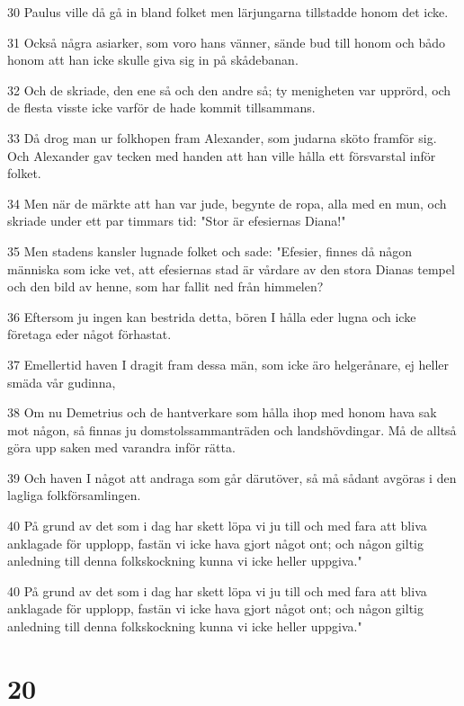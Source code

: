 \par 30 Paulus ville då gå in bland folket men lärjungarna tillstadde honom det icke.
\par 31 Också några asiarker, som voro hans vänner, sände bud till honom och bådo honom att han icke skulle giva sig in på skådebanan.
\par 32 Och de skriade, den ene så och den andre så; ty menigheten var upprörd, och de flesta visste icke varför de hade kommit tillsammans.
\par 33 Då drog man ur folkhopen fram Alexander, som judarna sköto framför sig. Och Alexander gav tecken med handen att han ville hålla ett försvarstal inför folket.
\par 34 Men när de märkte att han var jude, begynte de ropa, alla med en mun, och skriade under ett par timmars tid: "Stor är efesiernas Diana!"
\par 35 Men stadens kansler lugnade folket och sade: "Efesier, finnes då någon människa som icke vet, att efesiernas stad är vårdare av den stora Dianas tempel och den bild av henne, som har fallit ned från himmelen?
\par 36 Eftersom ju ingen kan bestrida detta, bören I hålla eder lugna och icke företaga eder något förhastat.
\par 37 Emellertid haven I dragit fram dessa män, som icke äro helgerånare, ej heller smäda vår gudinna,
\par 38 Om nu Demetrius och de hantverkare som hålla ihop med honom hava sak mot någon, så finnas ju domstolssammanträden och landshövdingar. Må de alltså göra upp saken med varandra inför rätta.
\par 39 Och haven I något att andraga som går därutöver, så må sådant avgöras i den lagliga folkförsamlingen.
\par 40 På grund av det som i dag har skett löpa vi ju till och med fara att bliva anklagade för upplopp, fastän vi icke hava gjort något ont; och någon giltig anledning till denna folkskockning kunna vi icke heller uppgiva."
\par 40 På grund av det som i dag har skett löpa vi ju till och med fara att bliva anklagade för upplopp, fastän vi icke hava gjort något ont; och någon giltig anledning till denna folkskockning kunna vi icke heller uppgiva."

\chapter{20}

